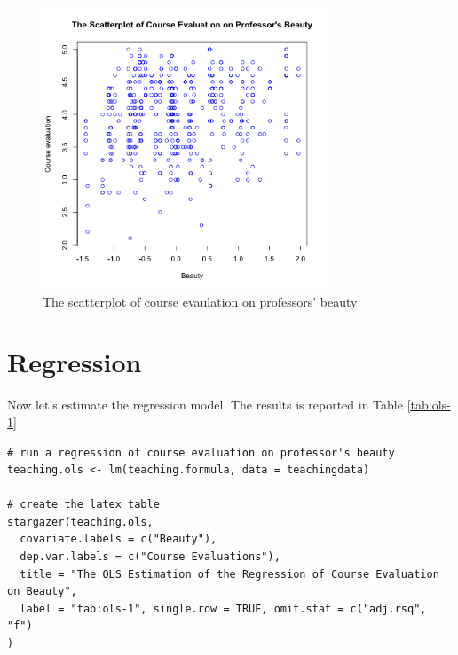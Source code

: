 \documentclass[a4paper,11pt]{article}
\begin{document}
\begin{figure}[htbp]
\centering
\includegraphics[width=0.75\textwidth]{beauty.png}
\caption{\label{fig:org08f2500}
The scatterplot of course evaulation on professors' beauty}
\end{figure}


\section{Regression}
\label{sec:org554f9f0}

Now let's estimate the regression model. The results is reported
in Table \ref{tab:ols-1}

\begin{verbatim}
# run a regression of course evaluation on professor's beauty
teaching.ols <- lm(teaching.formula, data = teachingdata)

# create the latex table
stargazer(teaching.ols,
  covariate.labels = c("Beauty"),
  dep.var.labels = c("Course Evaluations"),
  title = "The OLS Estimation of the Regression of Course Evaluation on Beauty",
  label = "tab:ols-1", single.row = TRUE, omit.stat = c("adj.rsq", "f")
)
\end{verbatim}
\end{document}
